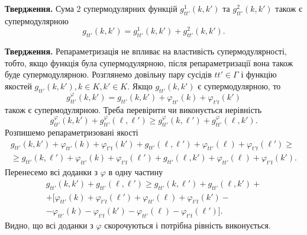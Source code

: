 \textbf{Твердження.}
Сума 2 супермодулярних функцій $g^1_{tt'}(k,k')$ та $g^2_{tt'}(k,k')$ також є супермодулярною
\begin{equation*}
  g_{tt'}(k,k')=g^1_{tt'}(k,k')+g^2_{tt'}(k,k').
\end{equation*}

\textbf{Твердження.}
Репараметризація не впливає на властивість супермодулярності, тобто, якщо функція була
супермодулярною, після репараметризації вона також буде супермодулярною.
Розглянемо довільну пару сусідів $tt'\in\Gamma$ і функцію якостей $g_{tt'}(k,k'), k\in K, k'\in K$.
Якщо $g_{tt'}(k,k')$ є супермодулярною, то
\begin{equation}
  g^{\varphi}_{tt'}(k,k')=g_{tt'}(k,k') + \varphi_{tt'}(k) + \varphi_{t't}(k')
\end{equation} також є супермодулярною.
Треба перевірити чи виконується нерівність
\begin{equation}
  g^{\varphi}_{tt'}(k,k') + g^{\varphi}_{tt'}(\ell,\ell')\geq g^{\varphi}_{tt'}(k,\ell') + g^{\varphi}_{tt'}(\ell,k').
\end{equation}
Розпишемо репараметризовані якості
\begin{gather*}
  g_{tt'}(k,k') + \varphi_{tt'}(k) + \varphi_{t't}(k') + g_{tt'}(\ell,\ell') + \varphi_{tt'}(\ell) + \varphi_{t't}(\ell') \geq \\
  \geq g_{tt'}(k,\ell') + \varphi_{tt'}(k) + \varphi_{t't}(\ell') + g_{tt'}(\ell,k') + \varphi_{tt'}(\ell) + \varphi_{t't}(k').
\end{gather*}
Перенесемо всі доданки з $\varphi$ в одну частину
\begin{gather*}
  g_{tt'}(k,k') + g_{tt'}(\ell,\ell') \geq g_{tt'}(k,\ell') + g_{tt'}(\ell,k') + \\
  + [\varphi_{tt'}(k) + \varphi_{t't}(\ell')  + \varphi_{tt'}(\ell) + \varphi_{t't}(k')-\\
   -\varphi_{tt'}(k) - \varphi_{t't}(k') - \varphi_{tt'}(\ell) - \varphi_{t't}(\ell')].
\end{gather*}
Видно, що всі доданки з $\varphi$ скорочуються і потрібна рівність виконується.
